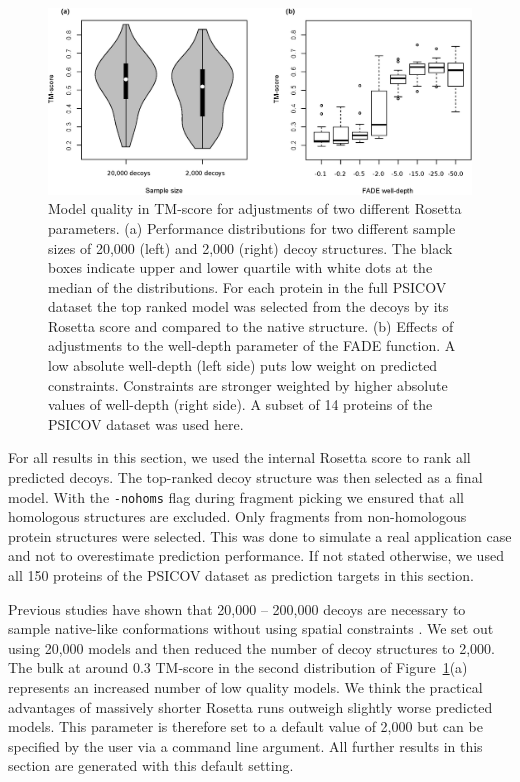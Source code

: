 \documentclass{bioinfo}
\begin{document}
\begin{figure}[!tpb]%
\centerline{\includegraphics[scale=0.7]{figures/rosetta.eps}}
\caption{Model quality in TM-score for adjustments of two
 different Rosetta parameters. (a) Performance distributions 
 for two different sample sizes of 20,000 (left) and 2,000 (right) 
 decoy structures. The black boxes indicate upper and lower 
 quartile with white dots at the median of the distributions. For each 
 protein in the full PSICOV dataset the top 
 ranked model was selected from the decoys by its Rosetta score and 
 compared to the native structure. (b) Effects of adjustments to 
 the well-depth parameter of the FADE function. A low absolute 
 well-depth (left side) puts low weight on predicted constraints. 
 Constraints are stronger weighted by higher absolute values of 
 well-depth (right side). A subset of 14 proteins of the PSICOV dataset was used here.}\label{fig:ros} 
\end{figure}

For all results in this section, we used the internal Rosetta score to
rank all predicted decoys. The top-ranked decoy structure was then
selected as a final model. With the {\tt -nohoms} flag during fragment
picking we ensured that all homologous structures are excluded. Only
fragments from non-homologous protein structures were selected. This
was done to simulate a real application case and not to overestimate
prediction performance. If not stated otherwise, we used all 150 proteins of
the PSICOV dataset as prediction targets in this section. 

Previous studies have shown that 20,000 -- 200,000 decoys are
necessary to sample native-like conformations without using spatial
constraints \cite[]{Simons10526365}. We set out using 20,000 models
and then reduced the number of decoy structures to
2,000. The bulk at around 0.3 TM-score in the second
distribution of Figure~\ref{fig:ros}(a) represents an increased
number of low quality models. We think the practical advantages of
massively shorter Rosetta runs outweigh slightly worse predicted
models. This parameter is therefore set to a default value of 2,000
but can be specified by the user via a command line argument. All
further results in this section are generated with this default
setting. 
\end{document}
